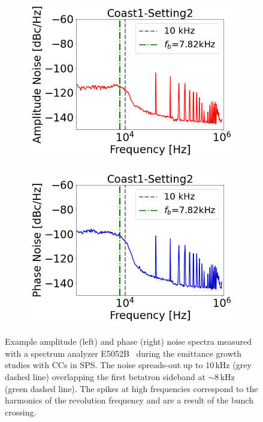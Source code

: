  \begin{figure}[!ht]
   \centering
   \begin{subfigure}[t]{0.45\textwidth}
       \centering
       \includegraphics[width=1\textwidth]{images/Ch5/Measured_spectrum_MD5_Coast1-Setting2-AN.csv_no_psd.png}
   \end{subfigure}
   \hfill
   \begin{subfigure}[t]{0.45\textwidth}
       \centering
       \includegraphics[width=1\textwidth]{images/Ch5/Measured_spectrum_MD5_Coast1-Setting2-PN.csv_no_psd.png}
   \end{subfigure}
   \hfill
    \caption{Example amplitude (left) and phase (right) noise spectra measured with a spectrum analyzer E5052B~\cite{E5052B_insight} during the emittance growth studies with CCs in SPS. The noise spreads-out up to 10\,kHz (grey dashed line) overlapping the first betatron sideband at $\sim$8\,kHz (green dashed line). The spikes at high frequencies correspond to the harmonics of the revolution frequency and are a result of the bunch crossing.} %
    \label{fig:example_PN_and_AN_coast1_setting2}
\end{figure}

